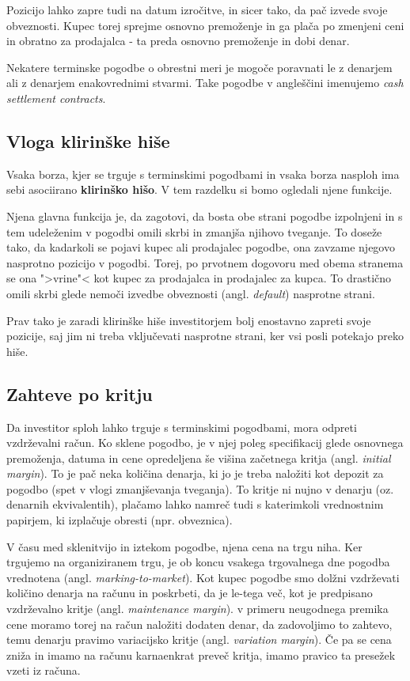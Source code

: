 \documentclass[a4paper, 11pt]{article}
\begin{document}
Pozicijo lahko zapre tudi na datum izročitve, in sicer tako, da pač izvede svoje obveznosti. 
Kupec torej sprejme osnovno premoženje in ga plača po zmenjeni ceni in obratno za prodajalca - 
ta preda osnovno premoženje in dobi denar. 

Nekatere terminske pogodbe o obrestni meri je mogoče poravnati le z denarjem ali z denarjem 
enakovrednimi stvarmi. Take pogodbe v angleščini imenujemo \textit{cash settlement contracts}.

\subsection{Vloga klirinške hiše}
Vsaka borza, kjer se trguje s terminskimi pogodbami in vsaka borza nasploh ima sebi asociirano 
\textbf{klirinško hišo}. V tem razdelku si bomo ogledali njene funkcije.

Njena glavna funkcija je, da zagotovi, da bosta obe strani pogodbe izpolnjeni in s tem 
udeleženim v pogodbi omili skrbi in zmanjša njihovo tveganje. To doseže tako, da kadarkoli
se pojavi kupec ali prodajalec pogodbe, ona zavzame njegovo nasprotno pozicijo v pogodbi.
Torej, po prvotnem dogovoru med obema stranema se ona ">vrine"< kot kupec za prodajalca in 
prodajalec za kupca. To drastično omili skrbi glede nemoči izvedbe obveznosti (angl. 
\textit{default}) nasprotne strani. 

Prav tako je zaradi klirinške hiše investitorjem bolj enostavno zapreti svoje pozicije, saj 
jim ni treba vključevati nasprotne strani, ker vsi posli potekajo preko hiše. 

\subsection{Zahteve po kritju}
Da investitor sploh lahko trguje s terminskimi pogodbami, mora odpreti vzdrževalni račun. 
Ko sklene pogodbo, je v njej poleg specifikacij glede osnovnega premoženja, datuma in cene 
opredeljena še višina začetnega kritja (angl. \textit{initial margin}). To je pač neka 
količina denarja, ki jo je treba naložiti kot depozit za pogodbo (spet v vlogi zmanjševanja 
tveganja). To kritje ni nujno v denarju (oz. denarnih ekvivalentih), plačamo lahko namreč 
tudi s katerimkoli vrednostnim papirjem, ki izplačuje obresti (npr. obveznica).

V času med sklenitvijo in iztekom pogodbe, njena cena na trgu niha. Ker trgujemo na organiziranem
trgu, je ob koncu vsakega trgovalnega dne pogodba vrednotena (angl. \textit{marking-to-market}). 
Kot kupec pogodbe smo dolžni vzdrževati količino denarja na računu in poskrbeti, da je le-tega več, 
kot je predpisano vzdrževalno kritje (angl. \textit{maintenance margin}). v primeru neugodnega 
premika cene moramo torej na račun naložiti dodaten denar, da zadovoljimo to zahtevo, temu denarju 
pravimo variacijsko kritje (angl. \textit{variation margin}). Če pa se cena zniža in imamo na 
računu karnaenkrat preveč kritja, imamo pravico ta presežek vzeti iz računa. 
\end{document}
